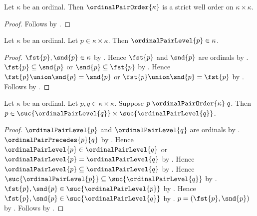 \begin{theorem}\label{ordinal_pair_order_is_strict_well_order}
    Let $\kappa$ be an ordinal.
    Then $\ordinalPairOrder{\kappa}$ is a strict well order on
        $\kappa\times\kappa$.
\end{theorem}
\begin{proof}
    Follows by .
\end{proof}

\begin{proposition}\label{ordinal_pair_level_belongs}
    Let $\kappa$ be an ordinal.
    Let $p\in\kappa\times\kappa$.
    Then $\ordinalPairLevel{p}\in\kappa$.
\end{proposition}
\begin{proof}
    $\fst{p},\snd{p}\in\kappa$ by .
    Hence $\fst{p}$ and $\snd{p}$ are ordinals
        by .
    $\fst{p}\subseteq\snd{p}$ or $\snd{p}\subseteq\fst{p}$
        by .
    Hence $\fst{p}\union\snd{p}=\snd{p}$ or
        $\fst{p}\union\snd{p}=\fst{p}$
        by .
    Follows by .
\end{proof}

\begin{proposition}\label{ordinal_pair_predecessor_bound}
    Let $\kappa$ be an ordinal.
    Let $p,q\in\kappa\times\kappa$.
    Suppose $p\mathrel{\ordinalPairOrder{\kappa}}q$.
    Then $p\in
        \suc{\ordinalPairLevel{q}}\times\suc{\ordinalPairLevel{q}}$.
\end{proposition}
\begin{proof}
    $\ordinalPairLevel{p}$ and $\ordinalPairLevel{q}$ are ordinals
        by .
    $\ordinalPairPrecedes{p}{q}$ by .
    Hence $\ordinalPairLevel{p}\in\ordinalPairLevel{q}$ or
        $\ordinalPairLevel{p}=\ordinalPairLevel{q}$
        by .
    Hence $\ordinalPairLevel{p}\subseteq\ordinalPairLevel{q}$
        by .
    Hence $\suc{\ordinalPairLevel{p}}
        \subseteq\suc{\ordinalPairLevel{q}}$
        by .
    $\fst{p},\snd{p}\in\suc{\ordinalPairLevel{p}}$
        by .
    Hence $\fst{p},\snd{p}\in\suc{\ordinalPairLevel{q}}$
        by .
    $p=(\fst{p},\snd{p})$
        by .
    Follows by .
\end{proof}

